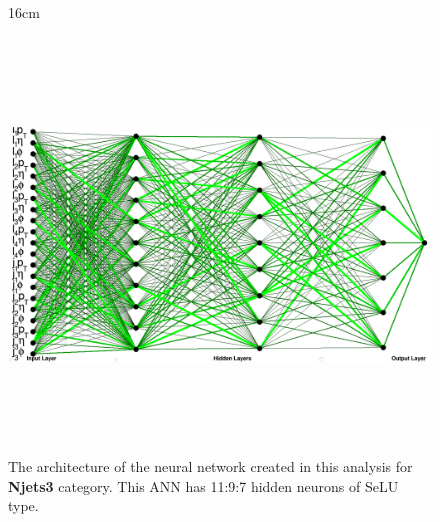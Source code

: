 \begin{figure}[H!]{16cm}
	\caption{The architecture of the neural network created in this analysis for \textbf{Njets3} category. This ANN has 11:9:7 hidden neurons of SeLU type.}
	\includegraphics[width=18cm,height=11cm,angle=90]{ChapterAnalysis/figs/k24nj3_architecture_horizontal}
\end{figure}

\label{app:significance_cutting_NNs}

